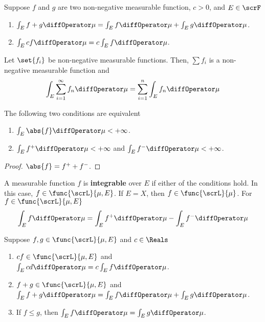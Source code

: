 \begin{theorem}
    Suppose \(f\) and \(g\) are two non-negative measurable function, \(c > 0\), and \(E \in \scrF\) 
    \begin{enumerate}
        \item \(\int_E f+ g \diffOperator \mu = \int_E f \diffOperator \mu + \int_E g \diffOperator \mu\).
        \item \(\int_E cf \diffOperator \mu = c \int_E f \diffOperator \mu\).
    \end{enumerate}
\end{theorem}

\begin{corollary}
    Let \(\set{f_i}\) be non-negative measurable functions. Then, \(\sum f_i\) is a non-negative measurable function and 
    \begin{equation*}
        \int_E \sum_{i = 1}^{\infty} f_n \diffOperator\mu = \sum_{i = 1}^n \int_E f_n \diffOperator \mu 
    \end{equation*}
\end{corollary}

\begin{lemma}
    The following two conditions are equivalent 
    \begin{enumerate}
        \item \(\int_E \abs{f} \diffOperator \mu < +\infty\).
        \item \(\int_E f^+ \diffOperator \mu < +\infty \) and \(\int_E f^- \diffOperator \mu < + \infty\).
    \end{enumerate}
\end{lemma}
\begin{proof}
    \(\abs{f} = f^+ + f^-\).
\end{proof}

\begin{definition}
    A measurable function \(f\) is \textbf{integrable} over \(E\) if either of the conditions hold. In this case, \(f \in \func{\scrL}{\mu,E}\). If \(E = X\), then \(f \in \func{\scrL}{\mu}\). For \(f \in \func{\scrL}{\mu,E}\) 
    \begin{equation*}
        \int_E f \diffOperator \mu  = \int_E f^+ \diffOperator \mu - \int_E f^- \diffOperator \mu 
    \end{equation*}
\end{definition}

\begin{theorem}
    Suppose \(f,g \in \func{\scrL}{\mu,E}\) and \(c \in \Reals\) 
    \begin{enumerate}
        \item \(cf \in \func{\scrL}{\mu,E}\) and \(\int_E cd \diffOperator \mu = c \int_E f \diffOperator \mu\). 
        \item \(f +g \in \func{\scrL}{\mu,E}\) and \(\int_E f + g \diffOperator \mu = \int_E f \diffOperator \mu + \int_E g \diffOperator \mu\).
        \item If \(f \leq g\), then \(\int_E f\diffOperator \mu = \int_E g \diffOperator \mu\).
    \end{enumerate}
\end{theorem}

